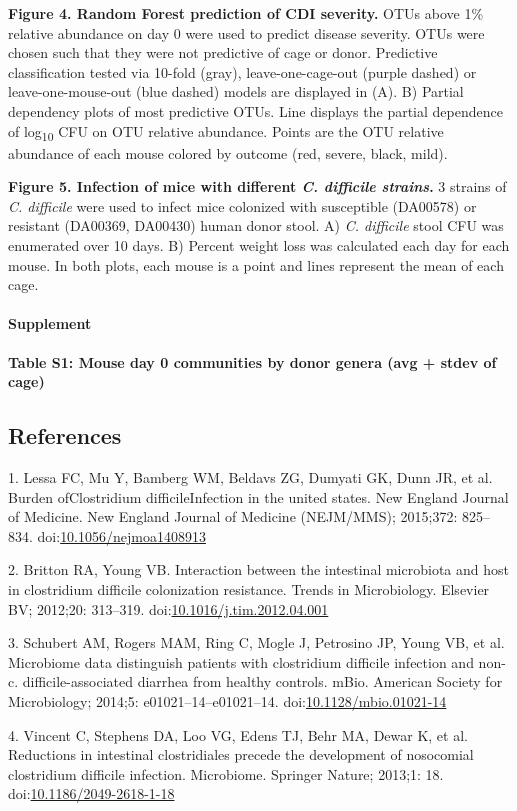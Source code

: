 \documentclass[11pt,]{article}
\begin{document}
\textbf{Figure 4. Random Forest prediction of CDI severity.} OTUs above
1\% relative abundance on day 0 were used to predict disease severity.
OTUs were chosen such that they were not predictive of cage or donor.
Predictive classification tested via 10-fold (gray), leave-one-cage-out
(purple dashed) or leave-one-mouse-out (blue dashed) models are
displayed in (A). B) Partial dependency plots of most predictive OTUs.
Line displays the partial dependence of log\textsubscript{10} CFU on OTU
relative abundance. Points are the OTU relative abundance of each mouse
colored by outcome (red, severe, black, mild).

\textbf{Figure 5. Infection of mice with different \emph{C. difficile
strains}.} 3 strains of \emph{C. difficile} were used to infect mice
colonized with susceptible (DA00578) or resistant (DA00369, DA00430)
human donor stool. A) \emph{C. difficile} stool CFU was enumerated over
10 days. B) Percent weight loss was calculated each day for each mouse.
In both plots, each mouse is a point and lines represent the mean of
each cage.

\paragraph{Supplement}\label{supplement}

\textbf{Table S1: Mouse day 0 communities by donor genera (avg + stdev
of cage)}

\newpage

\subsection*{References}\label{references}

1. Lessa FC, Mu Y, Bamberg WM, Beldavs ZG, Dumyati GK, Dunn JR, et al.
Burden ofClostridium difficileInfection in the united states. New
England Journal of Medicine. New England Journal of Medicine (NEJM/MMS);
2015;372: 825--834.
doi:\href{http://dx.doi.org/10.1056/nejmoa1408913}{10.1056/nejmoa1408913}

2. Britton RA, Young VB. Interaction between the intestinal microbiota
and host in clostridium difficile colonization resistance. Trends in
Microbiology. Elsevier BV; 2012;20: 313--319.
doi:\href{http://dx.doi.org/10.1016/j.tim.2012.04.001}{10.1016/j.tim.2012.04.001}

3. Schubert AM, Rogers MAM, Ring C, Mogle J, Petrosino JP, Young VB, et
al. Microbiome data distinguish patients with clostridium difficile
infection and non-c. difficile-associated diarrhea from healthy
controls. mBio. American Society for Microbiology; 2014;5:
e01021--14--e01021--14.
doi:\href{http://dx.doi.org/10.1128/mbio.01021-14}{10.1128/mbio.01021-14}

4. Vincent C, Stephens DA, Loo VG, Edens TJ, Behr MA, Dewar K, et al.
Reductions in intestinal clostridiales precede the development of
nosocomial clostridium difficile infection. Microbiome. Springer Nature;
2013;1: 18.
doi:\href{http://dx.doi.org/10.1186/2049-2618-1-18}{10.1186/2049-2618-1-18}
\end{document}
